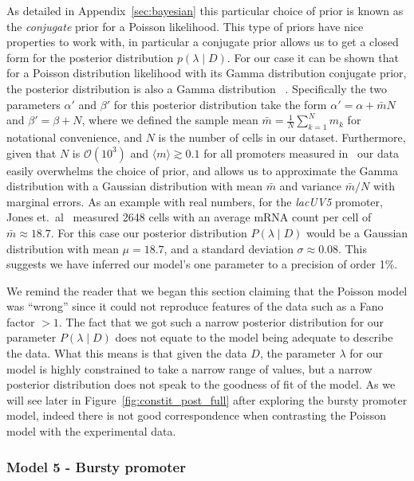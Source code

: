 As detailed in Appendix~\ref{sec:bayesian} this particular choice of prior is
known as the \textit{conjugate} prior for a Poisson likelihood. This type of
priors have nice properties to work with, in particular a conjugate prior allows
us to get a closed form for the posterior distribution $p(\lambda \mid D)$. For
our case it can be shown that for a Poisson distribution likelihood with its
Gamma distribution conjugate prior, the posterior distribution is also a Gamma
distribution ~\cite{Gelman2013}. Specifically the two parameters $\alpha'$ and
$\beta'$ for this posterior distribution take the form $\alpha' = \alpha +
\bar{m} N$ and $\beta' = \beta + N$, where we defined the sample mean $\bar{m} =
\frac{1}{N}\sum_{k=1}^N m_k$ for notational convenience, and $N$ is the number
of cells in our dataset. Furthermore, given that $N$ is $\mathcal{O}(10^3)$ and
$\langle m\rangle \gtrsim 0.1$ for all promoters measured in~\cite{Jones2014}
our data easily overwhelms the choice of prior, and allows us to approximate the
Gamma distribution with a Gaussian distribution with mean $\bar{m}$ and variance
$\bar{m} / N$ with marginal errors. As an example with real numbers, for the
\textit{lacUV5} promoter, Jones et.\ al~\cite{Jones2014} measured 2648 cells
with an average mRNA count per cell of $\bar{m} \approx 18.7$. For this case our
posterior distribution $P(\lambda \mid D)$ would be a Gaussian distribution with
mean $\mu = 18.7$, and a standard deviation $\sigma \approx 0.08$. This suggests
we have inferred our model's one parameter to a precision of order 1\%.

We remind the reader that we began this section claiming that the Poisson model
was ``wrong'' since it could not reproduce features of the data such as a Fano
factor $> 1$. The fact that we got such a narrow posterior distribution for our
parameter $P(\lambda \mid D)$ does not equate to the model being adequate to
describe the data. What this means is that given the data $D$, the parameter 
$\lambda$ for our model is highly constrained to take a narrow range of values,
but a narrow posterior distribution does not speak to the goodness of fit of the
model. As we will see later in Figure~\ref{fig:constit_post_full} after
exploring the bursty promoter model, indeed there is not good correspondence
when contrasting the Poisson model with the experimental data.

\subsubsection{Model 5 - Bursty promoter}

